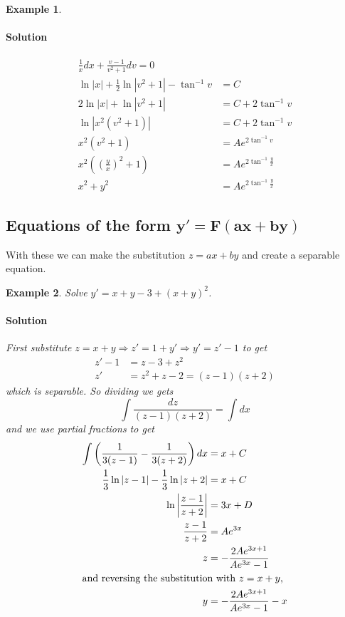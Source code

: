 \documentclass[letterpaper, 11pt, openany]{book}
\theoremstyle{mytheoremstyle}
\theoremstyle{myexamplestyle}
\newtheorem{example}{Example}[section]
\newenvironment{solution}{\paragraph{\sffamily \smaller \fontseries{b}\selectfont Solution}}{\hfill\faSquare}
\begin{document}
\begin{example}
\begin{enumerate}
\begin{solution}
\begin{align*}
                \frac{1}{x}dx + \frac{v-1}{v^{2}+1}dv = 0\\
                \ln |x| + \frac{1}{2}\ln |v^{2} + 1| - \tan^{-1} v &= C\\
                2\ln |x| + \ln |v^{2} + 1| &= C + 2\tan^{-1} v\\
                \ln|x^{2}(v^{2} + 1)| &= C + 2\tan^{-1} v\\
                x^{2}(v^{2} + 1) &= A e^{2\tan^{-1} v}\\
                x^{2}\left(\left(\frac{y}{x}\right)^{2} + 1\right) &= A e^{2\tan^{-1} \frac{y}{x}}\\
                x^{2} + y^{2} &= A e^{2\tan^{-1} \frac{y}{x}}
            \end{align*}
        \end{solution}
    \end{enumerate}
\end{example}

\subsection{Equations of the form \texorpdfstring{\(\bm{y' = F(ax+by)}\)}{y' = F(ax + by)}}
With these we can make the substitution \(z = ax + by\) and create a separable equation.

\begin{example}\label{e:de-ax+by-sub}
    Solve \(y' = x + y - 3 + (x+y)^{2}\).
    \begin{solution}
        First substitute \(z = x + y \Rightarrow z' = 1 + y' \Rightarrow y' = z' -1\) to get
        \begin{align*}
            z' - 1 &= z - 3 + z^{2}\\
            z' &= z^{2} + z -2 = (z-1)(z+2)
        \end{align*}
        which is separable. So dividing we gets
        \[\int \frac{dz}{(z-1)(z+2)} = \int dx\]
        and we use partial fractions to get
        \begin{align*}
            \int \left(\frac{1}{3(z-1)} - \frac{1}{3(z+2)}\right) dx &= x + C \\
            \frac{1}{3}\ln |z-1| - \frac{1}{3}\ln |z+2| &= x + C\\
            \ln \left|\frac{z-1}{z+2}\right| &= 3x + D\\
            \frac{z-1}{z+2} &= A e^{3x}\\
            z &= - \frac{2Ae^{3x + 1}}{Ae^{3x} - 1}\\
            \intertext{and reversing the substitution with \(z = x + y\),}
            y &= - \frac{2Ae^{3x + 1}}{Ae^{3x} - 1} - x
        \end{align*}
    \end{solution}
\end{example}
\end{document}
